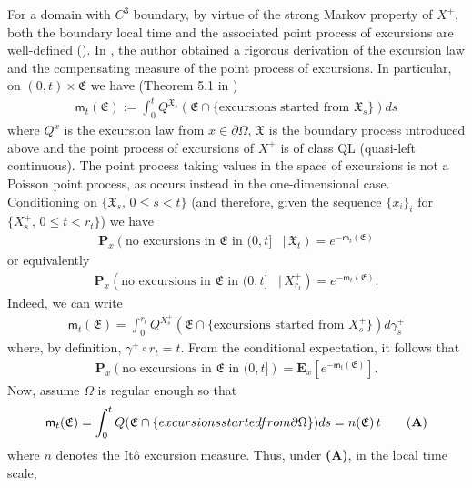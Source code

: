 \documentclass[11pt,a4paper]{article}
\newcommand{\magenta}{black}
\begin{document}
{\color{\magenta} For a domain with $C^3$ boundary, by virtue of the strong Markov property of $X^+$, both the boundary local time and the associated point process of excursions are well-defined (\cite{HSU86}). In \cite{HSU86}, the author obtained a rigorous derivation of the excursion law and the compensating measure of the point process of excursions. In particular, on $(0,t)\times \mathfrak{E}$ we have (Theorem 5.1 in \cite{HSU86})
\begin{align*}
\mathsf{m}_t (\mathfrak{E}) := \int_0^t Q^{\mathfrak{X}_s}(\mathfrak{E} \cap \{\textrm{excursions started from } \mathfrak{X}_s \}) ds
\end{align*}
where $Q^x$ is the excursion law from $x \in \partial \Omega$, $\mathfrak{X}$ is the boundary process introduced above and the point process of excursions of $X^+$ is of class QL (quasi-left continuous). The point process taking values in the space of excursions is not a Poisson point process, as occurs instead in the one-dimensional case. Conditioning on $\{\mathfrak{X}_s,\, 0 \leq s < t\}$ (and therefore, given the sequence $\{x_i\}_i$ for $\{X^+_s,\, 0 \leq t < r_t\}$) we have
\begin{align*}
\mathbf{P}_x(\textrm{no excursions in $\mathfrak{E}$ in $(0, t]$ }\, | \, \mathfrak{X}_t) = e^{- \mathsf{m}_t (\mathfrak{E})}
\end{align*}
or equivalently
\begin{align*}
\mathbf{P}_x(\textrm{no excursions in $\mathfrak{E}$ in $(0, t]$ }\, | \, X^+_{r_t}) = e^{- \mathsf{m}_t (\mathfrak{E})}.
\end{align*}
Indeed, we can write
\begin{align*}
\mathsf{m}_t(\mathfrak{E}) = \int_0^{r_t} Q^{X^+_s}(\mathfrak{E} \cap \{\textrm{excursions started from } X^+_s \}) d\gamma^+_s
\end{align*}
where, by definition, $\gamma^+ \circ r_t=t$.  From the conditional expectation, it follows that
\begin{align*}
\mathbf{P}_x(\textrm{no excursions in $\mathfrak{E}$ in $(0, t]$} ) = \mathbf{E}_x [ e^{- \mathsf{m}_t (\mathfrak{E})}]. 
\end{align*}
Now, assume $\Omega$ is regular enough so that
\begin{align}
\mathsf{m}_t (\mathfrak{E}) = \int_0^t Q(\mathfrak{E} \cap \{\textrm{excursions started from } \partial \Omega \}) ds = n(\mathfrak{E}) \, t \tag{{\bf A}}
\end{align}
where $n$ denotes the It\^{o} excursion measure. Thus, under {\bf (A)}, in the local time scale,
}
\end{document}

